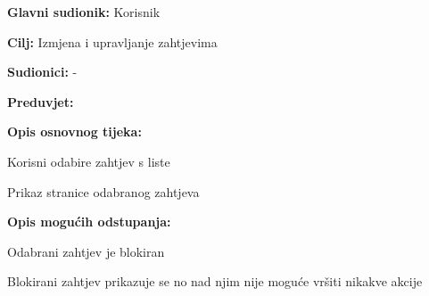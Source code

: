 				
					\noindent {}
					\begin{packed_item}
						
						\item \textbf{Glavni sudionik: }Korisnik
						\item  \textbf{Cilj:} Izmjena i upravljanje zahtjevima 
						\item  \textbf{Sudionici:} -
						\item  \textbf{Preduvjet:} 
						\item  \textbf{Opis osnovnog tijeka:}
						
						\item[] \begin{packed_enum}
							
							\item Korisni odabire zahtjev s liste
							\item Prikaz stranice odabranog zahtjeva

						\end{packed_enum}
						
						\item  \textbf{Opis mogućih odstupanja:}
						
						\item[] \begin{packed_item}
							
							\item[2.a] Odabrani zahtjev je blokiran
							\item[] \begin{packed_enum}
								
								\item Blokirani zahtjev prikazuje se no nad njim nije moguće vršiti nikakve akcije
								
							\end{packed_enum}
							
						\end{packed_item}
					\end{packed_item}
				
